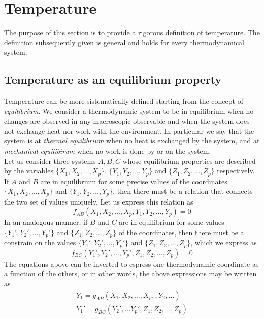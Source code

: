 \chapter{Temperature}
\label{ch:temperature}

The purpose of this section is to provide a rigorous definition of temperature. The definition subsequently given is general and holds for every thermodynamical system.
\section{Temperature as an equilibrium property}
Temperature can be more sistematically defined starting from the concept of \emph{equilibrium}. We consider a thermodynamic system to be in equilibrium when 
no changes are observed in any macroscopic observable and when the system does not exchange heat nor work with the environment. In particular we say that the system is at \emph{thermal equilibrium} when no heat is exchanged by the system, and
at \emph{mechanical equilibirum} when no work is done by or on the system. \\
Let us consider three systems $A, B, C$ whose equilibrium properties are described by the variables
$\{X_1, X_2, \dots, X_p\}$, $\{Y_1, Y_2, \dots, Y_p\}$ and $\{Z_1, Z_2, \dots, Z_p\}$ respectively. \\
If $A$ and $B$ are in equilibrium for some precise values of the coordinates $\{X_1, X_2, \dots, X_p\}$ and $\{Y_1, Y_2, \dots, Y_p\}$, then there must be a relation that connects the two set of values uniquely. Let us express this relation as
\begin{equation}
    f_{AB}(X_1, X_2, \dots, X_p, Y_1, Y_2, \dots, Y_p) = 0
    \label{eq:constrain1}
\end{equation}
In an analogous manner, if $B$ and $C$ are in equilibrium for some values $\{Y_1', Y_2', \dots, Y_p'\}$ and $\{Z_1, Z_2, \dots, Z_p\}$ of the coordinates, then there must be a constrain on the values $\{Y_1', Y_2', \dots, Y_p'\}$ and $\{Z_1, Z_2, \dots, Z_p\}$, which we express as
\begin{equation}
    f_{BC}(Y_1', Y_2', \dots, Y_p', Z_1, Z_2, \dots, Z_p) = 0
    \label{eq:constrain2}
\end{equation}
The equations above can be inverted to espress one thermodynamic coordinate as a function of the others, or in other words, the above expressions may be written as
\begin{gather*}
    Y_1 = g_{AB} (X_1, X_2, \dots, X_p, , Y_2, \dots) \\
    Y_1' = g_{BC} (Y_2', \dots Y_p', Z_1, Z_2, \dots, Z_p)
\end{gather*}
